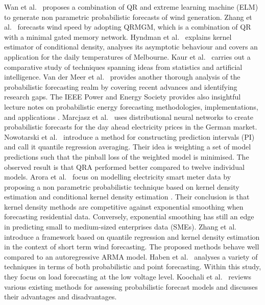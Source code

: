 Wan et al.\ \cite{wan2016direct} proposes a combination of QR and extreme learning machine (ELM) to generate non parametric probabilistic forecasts of wind generation.
Zhang et al.\ \cite{zhang2019wind} forecasts wind speed by adopting QRMGM, which is a combination of QR with a minimal gated memory network.
Hyndman et al.\ \cite{hyndman1996estimating} explains kernel estimator of conditional density, analyses its asymptotic behaviour and covers an application for the daily temperatures of Melbourne.
Kaur et al.\ \cite{kaur2022energy} carries out a comparative study of techniques spanning ideas from statistics and artificial intelligence.
Van der Meer et al.\ \cite{van2018review} provides another thorough analysis of the probabilistic forecasting realm by covering recent advances and identifying research gaps.
The IEEE Power and Energy Society provides also insightful lecture notes on probabilistic energy forecasting methodologies,
implementations, and applications .
Marcjasz et al.\ \cite{probablistic_electricity_forecast2} uses distributional neural networks to create probabilistic forecasts for the day ahead electricity prices in the German market.
Nowotarski et al.\ \cite{nowotarski2015computing} introduce a method for constructing prediction intervals (PI) and call it quantile regression averaging. Their idea is weighting a set of model predictions such that the pinball loss of the weighted model is minimised. The observed result is that QRA performed better compared to twelve individual models.
Arora et al.\ \cite{arora2016forecasting} focus on modelling electricity smart meter data by proposing a non parametric probabilistic technique based on kernel density estimation and conditional kernel density estimation \cite{rosenblatt1969conditional, hyndman1996estimating}. Their conclusion is that kernel density methods are competitive against exponential smoothing when forecasting residential data. Conversely, exponential smoothing has still an edge in predicting small to medium-sized enterprises data (SMEs).
Zhang et al.\ \cite{zhang2020probability} introduce a framework based on quantile regression and kernel density estimation in the context of short term wind forecasting. The proposed methods behave well compared to an autoregressive ARMA model.
Haben et al.\ \cite{haben2018short} analyses a variety of techniques in terms of both probabilistic and point forecasting. Within this study, they focus on load forecasting at the low voltage level.
Koochali et al.\ \cite{koochali2022random} reviews various existing methods for assessing probabilistic forecast models and discusses their advantages and disadvantages.
